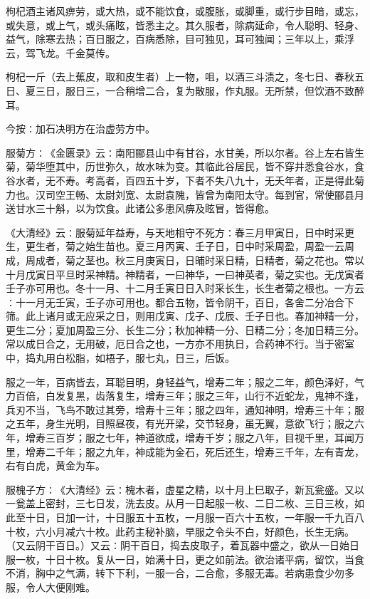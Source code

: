 \documentclass[a4paper,12pt,UTF8,twoside]{ctexbook}
\begin{document}
枸杞酒主诸风痹劳，或大热，或不能饮食，或腹胀，或脚重，或行步目暗，或忘，或失意，或上气，或头痛眩，皆悉主之。其久服者，除病延命，令人聪明、轻身、益气，除寒去热；百日服之，百病悉除，目可独见，耳可独闻；三年以上，乘浮云，驾飞龙。千金莫传。

枸杞一斤（去上蕉皮，取和皮生者）上一物，咀，以酒三斗渍之，冬七日、春秋五日、夏三日，服日三，一合稍增二合，复为散服，作丸服。无所禁，但饮酒不致醉耳。

今按∶加石决明方在治虚劳方中。

服菊方∶《金匮录》云∶南阳郦县山中有甘谷，水甘美，所以尔者。谷上左右皆生菊，菊华堕其中，历世弥久，故水味为变。其临此谷居民，皆不穿井悉食谷水，食谷水者，无不寿。考高者，百四五十岁，下者不失八九十，无夭年者，正是得此菊力也。汉司空王畅、太尉刘宽、太尉袁隗，皆曾为南阳太守。每到官，常使郦县月送甘水三十斛，以为饮食。此诸公多患风痹及眩冒，皆得愈。

《大清经》云∶服菊延年益寿，与天地相守不死方∶春三月甲寅日，日中时采更生，更生者，菊之始生苗也。夏三月丙寅、壬子日，日中时采周盈，周盈一云周成，周成者，菊之茎也。秋三月庚寅日，日晡时采日精，日精者，菊之花也。常以十月戊寅日平旦时采神精。神精者，一曰神华，一曰神英者，菊之实也。无戊寅者壬子亦可用也。冬十一月、十二月壬寅日日入时采长生，长生者菊之根也。一方云∶十一月无壬寅，壬子亦可用也。都合五物，皆令阴干，百日，各舍二分冶合下筛。此上诸月或无应采之日，则用戊寅、戊子、戊辰、壬子日也。春加神精一分，更生二分；夏加周盈三分、长生二分；秋加神精一分、日精二分；冬加日精三分。常以成日合之，无用破，厄日合之也，一方亦不用执日，合药神不行。当于密室中，捣丸用白松脂，如梧子，服七丸，日三，后饭。

服之一年，百病皆去，耳聪目明，身轻益气，增寿二年；服之二年，颜色泽好，气力百倍，白发复黑，齿落复生，增寿三年；服之三年，山行不近蛇龙，鬼神不逢，兵刃不当，飞鸟不敢过其旁，增寿十三年；服之四年，通知神明，增寿三十年；服之五年，身生光明，目照昼夜，有光开梁，交节轻身，虽无翼，意欲飞行；服之六年，增寿三百岁；服之七年，神道欲成，增寿千岁；服之八年，目视千里，耳闻万里，增寿二千年；服之九年，神成能为金石，死后还生，增寿三千年，左有青龙，右有白虎，黄金为车。

服槐子方∶《大清经》云∶槐木者，虚星之精，以十月上巳取子，新瓦瓮盛。又以一瓮盖上密封，三七日发，洗去皮。从月一日起服一枚、二日二枚、三日三枚，如此至十日，日加一计，十日服五十五枚，一月服一百六十五枚，一年服一千九百八十枚，六小月减六十枚。此药主秘补脑，早服之令头不白，好颜色，长生无病。（又云阴干百日。）又云∶阴干百日，捣去皮取子，着瓦器中盛之，欲从一日始日服一枚，十日十枚。复从一日，始满十日，更之如前法。欲治诸平病，留饮，当食不消，胸中之气满，转下下利，一服一合，二合愈，多服无毒。若病患食少勿多服，令人大便刚难。
\end{document}
